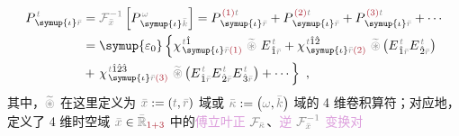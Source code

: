 \begin{subequations}
	\abovedisplayskip=10pt
	\belowdisplayskip=12pt
\begin{align}
	P^{\;\!\mathcolor{gray}{t}}_{\;\! \symup{\iota}\mathcolor{gray}{\bar{r}}} &= \mathcolor{gray}{\mathcal F_{\bar{x}}^{-1}} \left[ P^{\;\! \mathcolor{gray}{\omega}}_{\;\! \symup{\iota}\mathcolor{gray}{\bar{k}}} \right] = P^{\;\! \textcolor{Maroon}{(1)} \mathcolor{gray}{t}}_{\;\! \symup{\iota}\mathcolor{gray}{\bar{r}}} + P^{\;\! \textcolor{Maroon}{(2)} \mathcolor{gray}{t}}_{\;\! \symup{\iota}\mathcolor{gray}{\bar{r}}} + P^{\;\! \textcolor{Maroon}{(3)} \mathcolor{gray}{t}}_{\;\! \symup{\iota}\mathcolor{gray}{\bar{r}}} + \cdots \\ &= {\symup{\varepsilon_0}} \left\{ \chi^{\;\! \mathcolor{gray}{t} \hat{1}}_{\;\! \symup{\iota} \mathcolor{gray}{\bar{r}} \textcolor{Maroon}{(1)}} ~\mathcolor{gray}{\widetilde \circledast}~ E^{\;\!\mathcolor{gray}{t}}_{\;\! \hat{1} \mathcolor{gray}{\bar{r}}} + \chi^{\;\! \mathcolor{gray}{t} \hat{1} \hat{2}}_{\;\! \symup{\iota} \mathcolor{gray}{\bar{r}} \textcolor{Maroon}{(2)}}~\mathcolor{gray}{\widetilde \circledast}\left( E^{\;\!\mathcolor{gray}{t}}_{\;\! \hat{1} \mathcolor{gray}{\bar{r}}} E^{\;\!\mathcolor{gray}{t}}_{\;\! \hat{2} \mathcolor{gray}{\bar{r}}} \right) \right. \label{eq:P_tr} \\ &+ \left. \chi^{\;\! \mathcolor{gray}{t} \hat{1} \hat{2} \hat{3}}_{\;\! \symup{\iota} \mathcolor{gray}{\bar{r}} \textcolor{Maroon}{(3)}}~\mathcolor{gray}{\widetilde \circledast}\left( E^{\;\!\mathcolor{gray}{t}}_{\;\! \hat{1} \mathcolor{gray}{\bar{r}}} E^{\;\!\mathcolor{gray}{t}}_{\;\! \hat{2} \mathcolor{gray}{\bar{r}}} E^{\;\!\mathcolor{gray}{t}}_{\;\! \hat{3} \mathcolor{gray}{\bar{r}}} \right) + \cdots \right\}~,
\end{align}
\end{subequations}
其中，$\mathcolor{gray}{\widetilde \circledast}$ 在这里定义为 $\mathcolor{gray}{\bar{x}} := \left( \mathcolor{gray}{t}, \mathcolor{gray}{\bar{r}} \right)$ 域或 $\mathcolor{gray}{\bar{\kappa}} := \left( \mathcolor{gray}{\omega}, \mathcolor{gray}{\bar{k}} \right)$ 域的 4 维卷积算符；对应地，定义了 4 维时空域 $\mathcolor{gray}{\bar{x}} \in \mathcolor{gray}{\bar{\mathbb{R}}_{\textcolor{Maroon}{1+3}}}$ 中的\textcolor{Plum}{傅立叶正} $\mathcolor{gray}{\mathcal F_{\bar{\kappa}}}$、\textcolor{Plum}{逆} $\mathcolor{gray}{\mathcal F_{\bar{x}}^{-1}}$ \textcolor{Plum}{变换对}
